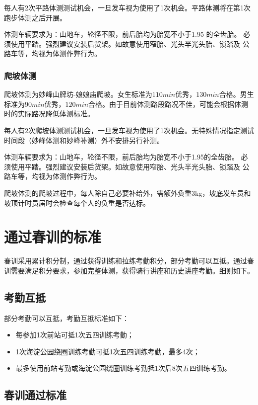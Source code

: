 \documentclass[UTF8]{ctexart}
\begin{document}
每人有2次平路体测测试机会，一旦发车视为使用了1次机会。平路体测将在第1次跑步体测之后开展。

体测车辆要求为：山地车，轮径不限，前后胎均为胎宽不小于1.95 的全齿胎。
必须使用平踏。强烈建议安装后货架。如故意使用窄胎、光头半光头胎、锁踏及
公路车等，均视为体测作弊行为。

\subsubsection{爬坡体测}

爬坡体测为妙峰山牌坊-娘娘庙爬坡。女生标准为$110min$优秀，$130min$合格。男生标准为$90min$优秀，$120min$合格。由于目前体测路段路况不佳，可能会根据体测时的实际路况降低体测标准。

每人有2次爬坡体测测试机会，一旦发车视为使用了1次机会。无特殊情况指定测试时间段（妙峰体测和妙峰补测）外不安排另行补测。

体测车辆要求为：山地车，轮径不限，前后胎均为胎宽不小于1.95的全齿胎。
必须使用平踏。强烈建议安装后货架。如故意使用窄胎、光头半光头胎、锁踏及
公路车等，均视为体测作弊行为。

爬坡体测的爬坡过程中，每人除自己必要补给外，需额外负重3kg，坡底发车员和坡顶计时员届时会检查每个人的负重是否达标。

\section{通过春训的标准}

春训采用累计积分制，通过获得训练和拉练考勤积分，部分考勤可以互抵。通过春训需要满足积分要求，参加完整体测，获得骑行讲座和历史讲座考勤。细则如下。

\subsection{考勤互抵}

部分考勤可以互抵，考勤互抵标准如下：

\begin{itemize}[nosep,left=4em]
    \item 每参加1次前站可抵1次五四训练考勤；
    \item 1次海淀公园绕圈训练考勤可抵1次五四训练考勤，最多4次；
    \item 最多使用前站考勤或海淀公园绕圈训练考勤抵1次后8次五四训练考勤。 
\end{itemize}


\subsection{春训通过标准}
\end{document}
